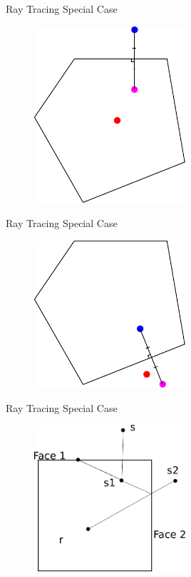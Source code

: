 \documentclass{beamer}
\begin{document}
\begin{frame}{Ray Tracing Special Case}

\begin{figure}[t]
\centering
\includegraphics[width=0.5\textwidth]{ImageSourcesDrawn2.pdf}
\end{figure}

\end{frame}


\begin{frame}{Ray Tracing Special Case}

\begin{figure}[t]
\centering
\includegraphics[width=0.5\textwidth]{ImageSourcesDrawn3.pdf}
\end{figure}

\end{frame}


\begin{frame}{Ray Tracing Special Case}

\begin{figure}[t]
\centering
\includegraphics[width=0.5\textwidth]{SecondOrderSpecialCase.pdf}
\end{figure}

\end{frame}
\end{document}
